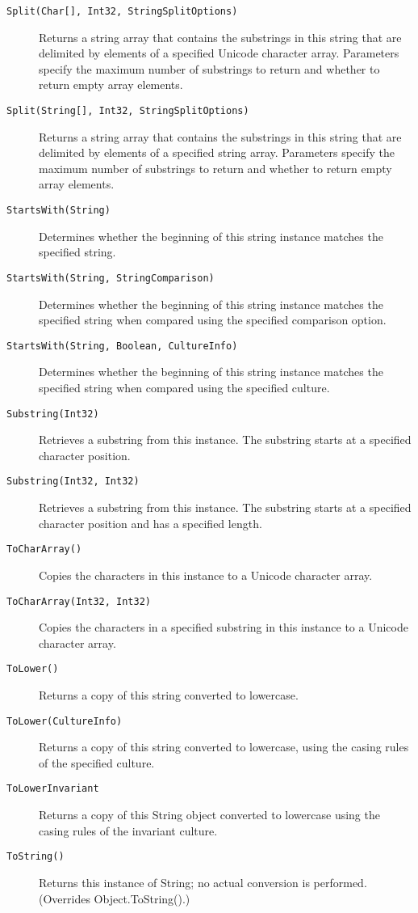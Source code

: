 \begin{description}
\item[\texttt{Split(Char[], Int32, StringSplitOptions)}] Returns a string array that contains the substrings in this string that are delimited by elements of a specified Unicode character array. Parameters specify the maximum number of substrings to return and whether to return empty array elements.
\item[\texttt{Split(String[], Int32, StringSplitOptions)}] Returns a string array that contains the substrings in this string that are delimited by elements of a specified string array. Parameters specify the maximum number of substrings to return and whether to return empty array elements.
\item[\texttt{StartsWith(String)}] Determines whether the beginning of this string instance matches the specified string.
\item[\texttt{StartsWith(String, StringComparison)}] Determines whether the beginning of this string instance matches the specified string when compared using the specified comparison option.
\item[\texttt{StartsWith(String, Boolean, CultureInfo)}] Determines whether the beginning of this string instance matches the specified string when compared using the specified culture.
\item[\texttt{Substring(Int32)}] Retrieves a substring from this instance. The substring starts at a specified character position.
\item[\texttt{Substring(Int32, Int32)}] Retrieves a substring from this instance. The substring starts at a specified character position and has a specified length.
\item[\texttt{ToCharArray()}] Copies the characters in this instance to a Unicode character array.
\item[\texttt{ToCharArray(Int32, Int32)}] Copies the characters in a specified substring in this instance to a Unicode character array.
\item[\texttt{ToLower()}] Returns a copy of this string converted to lowercase.
\item[\texttt{ToLower(CultureInfo)}] Returns a copy of this string converted to lowercase, using the casing rules of the specified culture.
\item[\texttt{ToLowerInvariant}] Returns a copy of this String object converted to lowercase using the casing rules of the invariant culture.
\item[\texttt{ToString()}] Returns this instance of String; no actual conversion is performed. (Overrides Object.ToString().)

\end{description}
